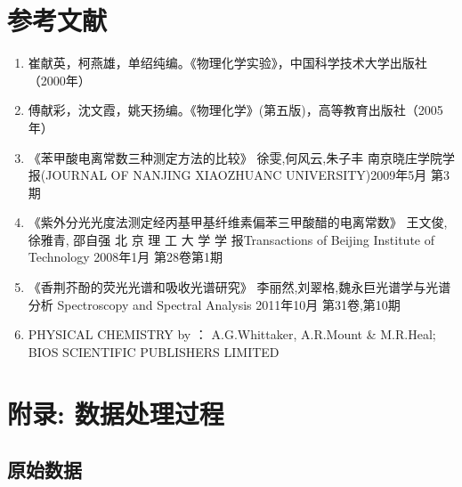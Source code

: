 \documentclass[11pt]{report}
\begin{document}
\part{参考文献}
\label{sec:org2a32c82}
\begin{enumerate}
\item 崔献英，柯燕雄，单绍纯编。《物理化学实验》，中国科学技术大学出版社（2000年）
\item 傅献彩，沈文霞，姚天扬编。《物理化学》(第五版)，高等教育出版社（2005年）
\item 《苯甲酸电离常数三种测定方法的比较》 徐雯,何风云,朱子丰 南京晓庄学院学报(JOURNAL OF NANJING XIAOZHUANC UNIVERSITY)2009年5月 第3期
\item 《紫外分光光度法测定经丙基甲基纤维素偏苯三甲酸醋的电离常数》 王文俊, 徐雅青, 邵自强 北 京 理 工 大 学 学 报Transactions of Beijing Institute of Technology 2008年1月 第28卷第1期
\item 《香荆芥酚的荧光光谱和吸收光谱研究》 李丽然,刘翠格,魏永巨光谱学与光谱分析 Spectroscopy and Spectral Analysis 2011年10月 第31卷,第10期
\item PHYSICAL CHEMISTRY   by ： A.G.Whittaker, A.R.Mount \& M.R.Heal;  BIOS SCIENTIFIC PUBLISHERS LIMITED
\end{enumerate}
\part{附录: 数据处理过程}
\label{sec:orgd41b748}
\chapter{原始数据}
\label{sec:orgac06086}
\end{document}

